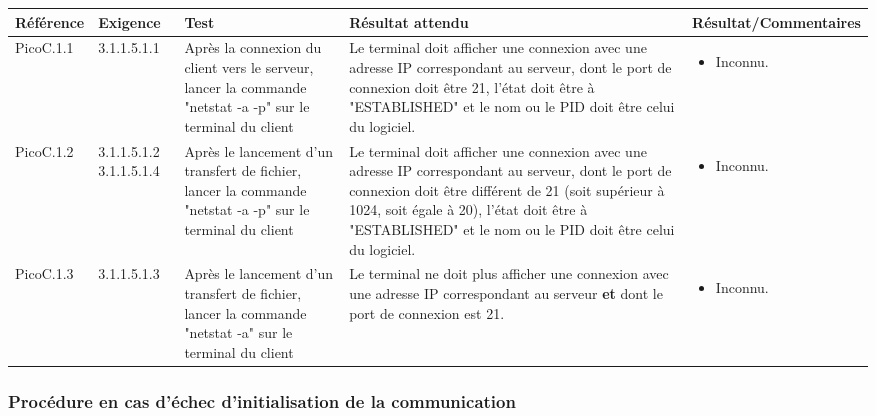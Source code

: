 \documentclass[10pt,a4paper,landscape]{report}
\begin{document}
\begin{center}
	\bgroup
	\def\arraystretch{1.5}
	\begin{tabular}{|p{2.5cm}|p{2cm}|p{8cm}|p{8cm}|p{5cm}|}
		\hline
		\rowcolor{gris}Référence & Exigence & Test & Résultat attendu & Résultat/Commentaires\\
		\hline
		PicoC.1.1 & 3.1.1.5.1.1 & Après la connexion du client vers le serveur, lancer la commande "netstat -a -p" sur le terminal du client & Le terminal doit afficher une connexion avec une adresse IP correspondant au serveur, dont le port de connexion doit être 21, l'état doit être à "ESTABLISHED" et le nom ou le PID doit être celui du logiciel.&\vspace*{-0.2cm} \begin{itemize}[label=$\ast$] \item \textcolor{ukwn}{Inconnu.}\end{itemize} \\
		\hline
		PicoC.1.2 & 3.1.1.5.1.2 3.1.1.5.1.4 & Après le lancement d'un transfert de fichier, lancer la commande "netstat -a -p" sur le terminal du client & Le terminal doit afficher une connexion avec une adresse IP correspondant au serveur, dont le port de connexion doit être différent de 21 (soit supérieur à 1024, soit égale à 20), l'état doit être à "ESTABLISHED" et le nom ou le PID doit être celui du logiciel. &\vspace*{-0.2cm} \begin{itemize}[label=$\ast$] \item \textcolor{ukwn}{Inconnu.}\end{itemize} \\
		\hline
		PicoC.1.3 & 3.1.1.5.1.3 & Après le lancement d'un transfert de fichier, lancer la commande "netstat -a" sur le terminal du client & Le terminal ne doit plus afficher une connexion avec une adresse IP correspondant au serveur \textbf{et} dont le port de connexion est 21. &\vspace*{-0.2cm} \begin{itemize}[label=$\ast$] \item \textcolor{ukwn}{Inconnu.}\end{itemize}\\
		\hline
	\end{tabular}
	\egroup
\end{center}

\subsubsection{Procédure en cas d'échec d'initialisation de la communication}
\end{document}
